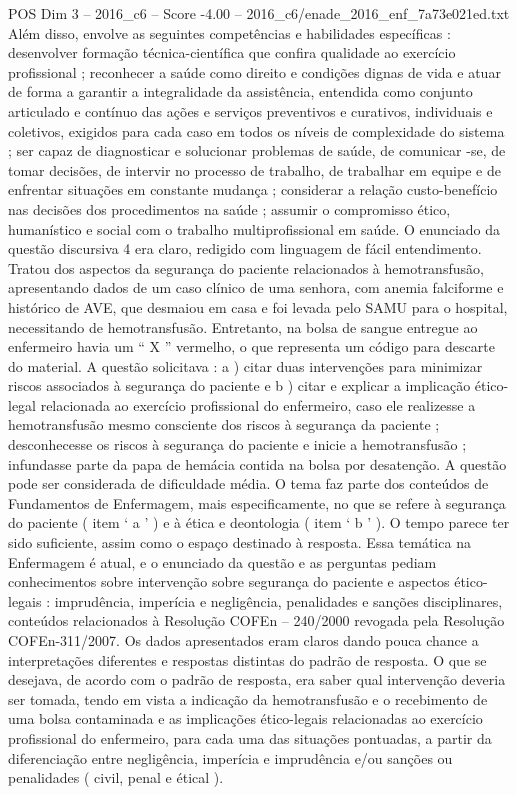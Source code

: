 \begin{textsample}{POS Dim 3 – 2016\_c6 – Score -4.00 – 2016\_c6/enade\_2016\_enf\_7a73e021ed.txt}
Além disso, envolve as seguintes competências e habilidades específicas : desenvolver formação técnica-científica que confira qualidade ao exercício profissional ; reconhecer a saúde como direito e condições dignas de vida e atuar de forma a garantir a integralidade da assistência, entendida como conjunto articulado e contínuo das ações e serviços preventivos e curativos, individuais e coletivos, exigidos para cada caso em todos os níveis de complexidade do sistema ; ser capaz de diagnosticar e solucionar problemas de saúde, de comunicar -se, de tomar decisões, de intervir no processo de trabalho, de trabalhar em equipe e de enfrentar situações em constante mudança ; considerar a relação custo-benefício nas decisões dos procedimentos na saúde ; assumir o compromisso ético, humanístico e social com o trabalho multiprofissional em saúde.
O enunciado da questão discursiva 4 era claro, redigido com linguagem de fácil entendimento.
Tratou dos aspectos da segurança do paciente relacionados à hemotransfusão, apresentando dados de um caso clínico de uma senhora, com anemia falciforme e histórico de AVE, que desmaiou em casa e foi levada pelo SAMU para o hospital, necessitando de hemotransfusão.
Entretanto, na bolsa de sangue entregue ao enfermeiro havia um “ X ” vermelho, o que representa um código para descarte do material.
A questão solicitava : a ) citar duas intervenções para minimizar riscos associados à segurança do paciente e b ) citar e explicar a implicação ético-legal relacionada ao exercício profissional do enfermeiro, caso ele realizesse a hemotransfusão mesmo consciente dos riscos à segurança da paciente ; desconhecesse os riscos à segurança do paciente e inicie a hemotransfusão ; infundasse parte da papa de hemácia contida na bolsa por desatenção.
A questão pode ser considerada de dificuldade média.
O tema faz parte dos conteúdos de Fundamentos de Enfermagem, mais especificamente, no que se refere à segurança do paciente ( item ‘ a ’ ) e à ética e deontologia ( item ‘ b ’ ).
O tempo parece ter sido suficiente, assim como o espaço destinado à resposta.
Essa temática na Enfermagem é atual, e o enunciado da questão e as perguntas pediam conhecimentos sobre intervenção sobre segurança do paciente e aspectos ético-legais : imprudência, imperícia e negligência, penalidades e sanções disciplinares, conteúdos relacionados à Resolução COFEn – 240/2000 revogada pela Resolução COFEn-311/2007.
Os dados apresentados eram claros dando pouca chance a interpretações diferentes e respostas distintas do padrão de resposta.
O que se desejava, de acordo com o padrão de resposta, era saber qual intervenção deveria ser tomada, tendo em vista a indicação da hemotransfusão e o recebimento de uma bolsa contaminada e as implicações ético-legais relacionadas ao exercício profissional do enfermeiro, para cada uma das situações pontuadas, a partir da diferenciação entre negligência, imperícia e imprudência e/ou sanções ou penalidades ( civil, penal e étical ).

\end{textsample}
